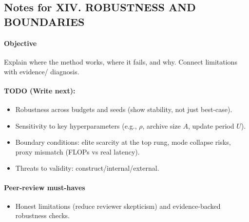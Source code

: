 \subsection*{Notes for XIV. ROBUSTNESS AND BOUNDARIES}
\paragraph{Objective}
Explain where the method works, where it fails, and why. Connect limitations with evidence/ diagnosis.

\paragraph{TODO (Write next):}
\begin{itemize}
  \item Robustness across budgets and seeds (show stability, not just best-case).
  \item Sensitivity to key hyperparameters (e.g., $\rho$, archive size $A$, update period $U$).
  \item Boundary conditions: elite scarcity at the top rung, mode collapse risks, proxy mismatch (FLOPs vs real latency).
  \item Threats to validity: construct/internal/external.
\end{itemize}

\paragraph{Peer-review must-haves}
\begin{itemize}
  \item Honest limitations (reduce reviewer skepticism) and evidence-backed robustness checks.
\end{itemize}

